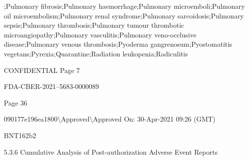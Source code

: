 \begin{refsection}
\begin{tcolorbox}[quote]
;Pulmonary fibrosis;Pulmonary haemorrhage;Pulmonary microemboli;Pulmonary oil microembolism;Pulmonary renal syndrome;Pulmonary sarcoidosis;Pulmonary sepsis;Pulmonary thrombosis;Pulmonary tumour thrombotic microangiopathy;Pulmonary vasculitis;Pulmonary veno-occlusive disease;Pulmonary venous thrombosis;Pyoderma gangrenosum;Pyostomatitis vegetans;Pyrexia;Quarantine;Radiation leukopenia;Radiculitis

CONFIDENTIAL Page 7

FDA-CBER-2021--5683-0000089

Page 36

090177e196ea1800\textbackslash{}Approved\textbackslash{}Approved On: 30-Apr-2021 09:26 (GMT)

BNT162b2

5.3.6 Cumulative Analysis of Post-authorization Adverse Event Reports


\end{tcolorbox}
\end{refsection}

